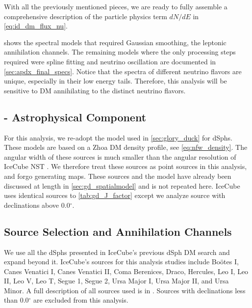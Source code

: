 With all the previously mentioned pieces, we are ready to fully assemble a comprehensive description of the particle physics term $dN/dE$ in \cref{eq:id_dm_flux_nu}.
\nuIDDMFlux

 shows the spectral models that required Gaussian smoothing, the leptonic annihilation channels.
The remaining models where the only processing steps required were spline fitting and neutrino oscillation are documented in \cref{sec:apdx_final_specs}.
Notice that the spectra of different neutrino flavors are unique, especially in their low energy tails.
Therefore, this analysis will be sensitive to DM annihilating to the distinct neutrino flavors.

\subsection{\J - Astrophysical Component}\label{sec:icDM_spatialmodel}

For this analysis, we re-adopt the \GS model \cite{Geringer_Sameth_2015} used in \cref{sec:glory_duck} for dSphs.
These models are based on a Zhoa DM density profile, see \cref{eq:nfw_density}.
The angular width of these sources is much smaller than the angular resolution of IceCube NST \cite{IC_NGC1068}.
We therefore treat these sources as point sources in this analysis, and forgo generating maps.
These sources and the \GS model have already been discussed at length in \cref{sec:gd_spatialmodel} and is not repeated here.
IceCube uses identical sources to \cref{tab:gd_J_factor} except we analyze source with declinations above 0.0$^\circ$.

\subsection{Source Selection and Annihilation Channels}\label{sec:ic3_study_selection}

We use all the dSphs presented in IceCube's previous dSph DM search \cite{IC3_DM2013} and expand beyond it.
IceCube's sources for this analysis studies include Boötes I, Canes Venatici I, Canes Venatici II, Coma Berenices, Draco, Hercules, Leo I, Leo II, Leo V, Leo T, Segue 1, Segue 2, Ursa Major I, Ursa Major II,  and Ursa Minor.
A full description of all sources used is in .
Sources with declinations less than 0.0$^\circ$ are excluded from this analysis.

